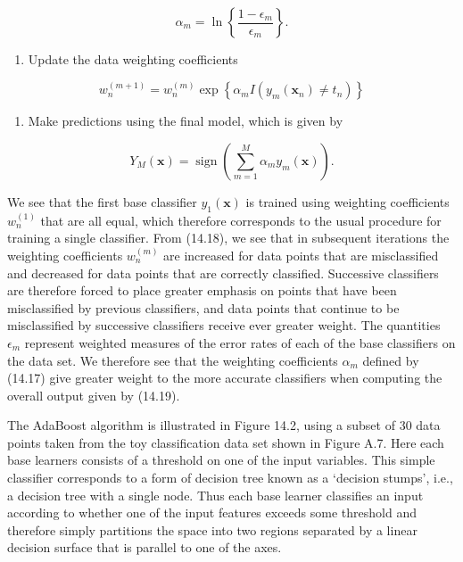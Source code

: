 \documentclass[
  10
]{article}
\providecommand{\tightlist}{%
  \setlength{\itemsep}{0pt}\setlength{\parskip}{0pt}}
\begin{document}
\[
\alpha_ {m} = \ln \left\{\frac {1 - \epsilon_ {m}}{\epsilon_ {m}} \right\}.\tag{14.17}
\]

\begin{enumerate}
\def\labelenumi{(\alph{enumi})}
\setcounter{enumi}{2}
\tightlist
\item
  Update the data weighting coefficients
\end{enumerate}

\[
w _ {n} ^ {(m + 1)} = w _ {n} ^ {(m)} \exp \left\{\alpha_ {m} I (y _ {m} (\mathbf {x} _ {n}) \neq t _ {n}) \right\}\tag{14.18}
\]

\begin{enumerate}
\def\labelenumi{\arabic{enumi}.}
\setcounter{enumi}{2}
\tightlist
\item
  Make predictions using the final model, which is given by
\end{enumerate}

\[
Y _ {M} (\mathbf {x}) = \operatorname{sign} \left(\sum_ {m = 1} ^ {M} \alpha_ {m} y _ {m} (\mathbf {x})\right).\tag{14.19}
\]

We see that the first base classifier \(y _ { 1 } ( \mathbf x )\) is
trained using weighting coefficients \(w _ { n } ^ { ( 1 ) }\) that are
all equal, which therefore corresponds to the usual procedure for
training a single classifier. From (14.18), we see that in subsequent
iterations the weighting coefficients \(w _ { n } ^ { ( m ) }\) are
increased for data points that are misclassified and decreased for data
points that are correctly classified. Successive classifiers are
therefore forced to place greater emphasis on points that have been
misclassified by previous classifiers, and data points that continue to
be misclassified by successive classifiers receive ever greater weight.
The quantities \(\epsilon _ { m }\) represent weighted measures of the
error rates of each of the base classifiers on the data set. We
therefore see that the weighting coefficients \(\alpha _ { m }\) defined
by (14.17) give greater weight to the more accurate classifiers when
computing the overall output given by (14.19).

The AdaBoost algorithm is illustrated in Figure 14.2, using a subset of
30 data points taken from the toy classification data set shown in
Figure A.7. Here each base learners consists of a threshold on one of
the input variables. This simple classifier corresponds to a form of
decision tree known as a `decision stumps', i.e., a decision tree with a
single node. Thus each base learner classifies an input according to
whether one of the input features exceeds some threshold and therefore
simply partitions the space into two regions separated by a linear
decision surface that is parallel to one of the axes.
\end{document}
